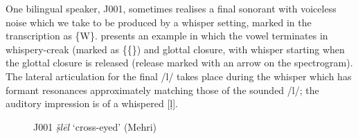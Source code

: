 \documentclass[output=paper]{langscibook}
\begin{document}
One bilingual speaker, J001, sometimes realises a final sonorant with voiceless noise which we take to be produced by a whisper setting, marked in the transcription as \{W\}.  presents an example in which the vowel terminates in whispery-creak (marked as \{\{\Vdottilde{}\}) and glottal closure, with whisper starting when the glottal closure is released (release marked with an arrow on the spectrogram). The lateral articulation for the final \mbox{/l/} takes place during the whisper which has formant resonances approximately matching those of the sounded \mbox{/l/}; the auditory impression is of a whispered [ḷ].

\begin{figure}[p]
\caption{\label{fig:watson:12} J001 \textit{ṣ̌lēl} ‘cross-eyed’ (Mehri)}
\end{figure}
\end{document}
